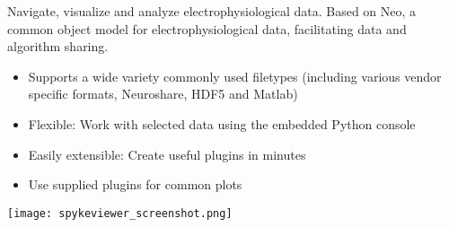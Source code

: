 \begin{multicols}{3}


Navigate, visualize and analyze electrophysiological data. Based on Neo, a common object model for electrophysiological data, facilitating data and algorithm sharing.

\begin{itemize}[nolistsep,topsep=0em,leftmargin=1pc]
\item Supports a wide variety commonly used filetypes (including various vendor specific formats, Neuroshare, HDF5 and Matlab)
\item Flexible: Work with selected data using the embedded Python console
\item Easily extensible: Create useful plugins in minutes
\item Use supplied plugins for common plots
\end{itemize}
\texttt{[image: spykeviewer\_screenshot.png]}


%

\end{multicols}


